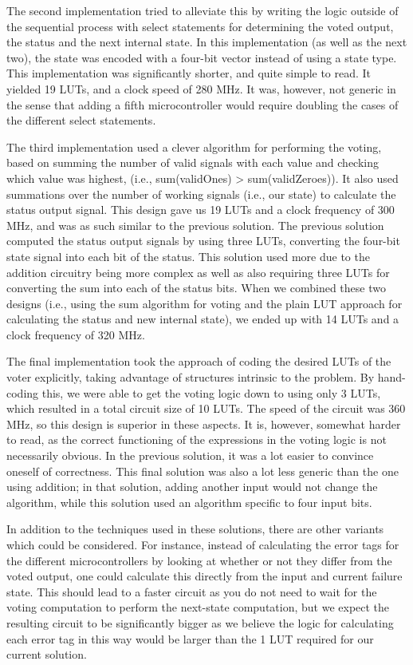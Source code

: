 \documentclass[11pt]{article}
\newcommand{\ie}{i.e.,\xspace}
\begin{document}
The second implementation tried to alleviate this by writing the logic
outside of the sequential process with select statements for
determining the voted output, the status and the next internal
state. In this implementation (as well as the next two), the state was
encoded with a four-bit vector instead of using a state type. This
implementation was significantly shorter, and quite simple to read. It
yielded 19 LUTs, and a clock speed of 280 MHz. It was, however, not
generic in the sense that adding a fifth microcontroller would require
doubling the cases of the different select statements. 

The third implementation used a clever algorithm for performing the
voting, based on summing the number of valid signals with each value
and checking which value was highest, (\ie sum(validOnes) >
sum(validZeroes)). It also used summations over the number of working
signals (\ie our state) to calculate the status output signal. This
design gave us 19 LUTs and a clock frequency of 300 MHz, and was as
such similar to the previous solution. The previous solution computed
the status output signals by using three LUTs, converting the four-bit
state signal into each bit of the status. This solution used more due
to the addition circuitry being more complex as well as also requiring
three LUTs for converting the sum into each of the status bits. When
we combined these two designs (\ie using the sum algorithm for voting
and the plain LUT approach for calculating the status and new internal
state), we ended up with 14 LUTs and a clock frequency of 320 MHz. 

The final implementation took the approach of coding the desired LUTs
of the voter explicitly, taking advantage of structures intrinsic to
the problem. By hand-coding this, we were able to get the voting logic
down to using only 3 LUTs, which resulted in a total circuit size of
10 LUTs. The speed of the circuit was 360 MHz, so this design is
superior in these aspects. It is, however, somewhat harder to read, as
the correct functioning of the expressions in the voting logic is not
necessarily obvious. In the previous solution, it was a lot easier to
convince oneself of correctness. This final solution was also a lot
less generic than the one using addition; in that solution, adding
another input would not change the algorithm, while this solution used
an algorithm specific to four input bits. 

In addition to the techniques used in these solutions, there are other
variants which could be considered. For instance, instead of
calculating the error tags for the different microcontrollers by
looking at whether or not they differ from the voted output, one could
calculate this directly from the input and current failure state. This
should lead to a faster circuit as you do not need to wait for the
voting computation to perform the next-state computation, but we
expect the resulting circuit to be significantly bigger as we believe
the logic for calculating each error tag in this way would be larger
than the 1 LUT required for our current solution.
\end{document}
